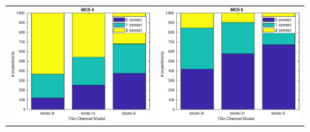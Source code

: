 \documentclass[accentcolor=tud8b,colorbacktitle]{tudbeamer}
\begin{document}
\begin{frame}
\begin{figure}[H]
\begin{tabular}{cc}
		\includegraphics[height=0.52\textheight]{../../gfx/plots/tgn-mcs4} &
		\includegraphics[height=0.52\textheight]{../../gfx/plots/tgn-mcs6} \\
	\end{tabular}
\end{figure}
\end{frame}
\end{document}
